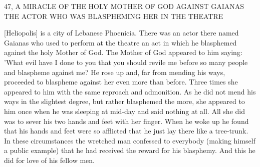47, A MIRACLE OF THE HOLY MOTHER OF GOD
AGAINST GAIANAS THE ACTOR WHO WAS
BLASPHEMING HER IN THE THEATRE

[Heliopolis] is a city of Lebanese Phoenicia.
There was an actor
there named Gaianas who used to perform at the theatre an act in
which he blasphemed against the holy Mother of God.
The Mother
of God appeared to him saying: 'What evil have I done to you that
you should revile me before so many people and blaspheme against
me? He rose up and, far from mending his ways, proceeded to
blaspheme against her even more than before.
Three times she
appeared to him with the same reproach and admonition.
As he did
not mend his ways in the slightest degree, but rather blasphemed the
more, she appeared to him once when he was sleeping at mid-day
and said nothing at all.
All she did was to sever his two hands and
feet with her finger.
When he woke up he found that his hands and
feet were so afflicted that he just lay there like a tree-trunk.
In these
circumstances the wretched man confessed to everybody (making
himself a public example) that he had received the reward for his
blasphemy.
And this he did for love of his fellow men.


